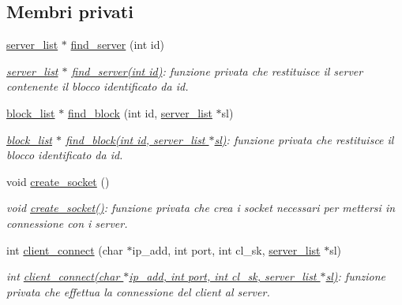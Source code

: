 \subsection*{Membri privati}
\begin{CompactItemize}
\item 
\hyperlink{structserver__list}{server\_\-list} $\ast$ \hyperlink{classLibrary_8af440e19a373cd2feabfec14509201c_8af440e19a373cd2feabfec14509201c}{find\_\-server} (int id)
\begin{CompactList}\small\item\em \hyperlink{structserver__list}{server\_\-list} $\ast$ \hyperlink{classLibrary_8af440e19a373cd2feabfec14509201c_8af440e19a373cd2feabfec14509201c}{find\_\-server(int id)}: funzione privata che restituisce il server contenente il blocco identificato da id. \item\end{CompactList}\item 
\hyperlink{structblock__list}{block\_\-list} $\ast$ \hyperlink{classLibrary_576c1813ccd1f66558aa29a72bc9a48d_576c1813ccd1f66558aa29a72bc9a48d}{find\_\-block} (int id, \hyperlink{structserver__list}{server\_\-list} $\ast$sl)
\begin{CompactList}\small\item\em \hyperlink{structblock__list}{block\_\-list} $\ast$ \hyperlink{classLibrary_576c1813ccd1f66558aa29a72bc9a48d_576c1813ccd1f66558aa29a72bc9a48d}{find\_\-block(int id, server\_\-list $\ast$sl)}: funzione privata che restituisce il blocco identificato da id. \item\end{CompactList}\item 
void \hyperlink{classLibrary_cd3582484c72ce7f8758a31e050d64e7_cd3582484c72ce7f8758a31e050d64e7}{create\_\-socket} ()
\begin{CompactList}\small\item\em void \hyperlink{classLibrary_cd3582484c72ce7f8758a31e050d64e7_cd3582484c72ce7f8758a31e050d64e7}{create\_\-socket()}: funzione privata che crea i socket necessari per mettersi in connessione con i server. \item\end{CompactList}\item 
int \hyperlink{classLibrary_993a8c688576ea49b82283bd5c38c7b5_993a8c688576ea49b82283bd5c38c7b5}{client\_\-connect} (char $\ast$ip\_\-add, int port, int cl\_\-sk, \hyperlink{structserver__list}{server\_\-list} $\ast$sl)
\begin{CompactList}\small\item\em int \hyperlink{classLibrary_993a8c688576ea49b82283bd5c38c7b5_993a8c688576ea49b82283bd5c38c7b5}{client\_\-connect(char $\ast$ip\_\-add, int port, int cl\_\-sk, server\_\-list $\ast$sl)}: funzione privata che effettua la connessione del client al server. \item\end{CompactList}\item 

\end{CompactItemize}

